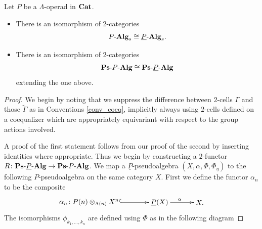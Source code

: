 \begin{thm}
Let $P$ be a $\Lambda$-operad in $\mathbf{Cat}$.
\begin{itemize}
\item There is an isomorphism of $2$-categories
    \[
        P\mbox{-}\mathbf{Alg}_{s} \cong \underline{P}\mbox{-}\mathbf{Alg}_{s}.
    \]
\item There is an isomorphism of $2$-categories
    \[
        \mathbf{Ps}\mbox{-}P\mbox{-}\mathbf{Alg} \cong \mathbf{Ps}\mbox{-}\underline{P}\mbox{-}\mathbf{Alg}
    \]
    extending the one above.
\end{itemize}
\end{thm}
\begin{proof}
We begin by noting that we suppress the difference between $2$-cells $\Gamma$ and those $\tilde{\Gamma}$ as in Conventions \ref{conv_coeq}, implicitly always using $2$-cells defined on a coequalizer which are appropriately equivariant with respect to the group actions involved.

A proof of the first statement follows from our proof of the second by inserting identities where appropriate. Thus we begin by constructing a $2$-functor $R \colon \mathbf{Ps}\mbox{-}\underline{P}\mbox{-}\mathbf{Alg} \rightarrow \mathbf{Ps}\mbox{-}P\mbox{-}\mathbf{Alg}$. We map a $\underline{P}$-pseudoalgebra $(X,\alpha,\Phi,\Phi_\eta)$ to the following $P$-pseudoalgebra on the same category $X$. First we define the functor $\alpha_n$ to be the composite
    \[
        \xy
            (0,0)*+{\alpha_n \colon \coeq{P}{X}{\Lambda}{n}}="00";
            (35,0)*+{\underline{P}(X)}="10";
            (55,0)*+{X.}="20";
            {\ar@{^{(}->} "00" ; "10"};
            {\ar^{\alpha} "10" ; "20"};
        \endxy
    \]
The isomorphisms $\phi_{k_1,\ldots,k_n}$ are defined using $\Phi$ as in the following diagram


\end{proof}
